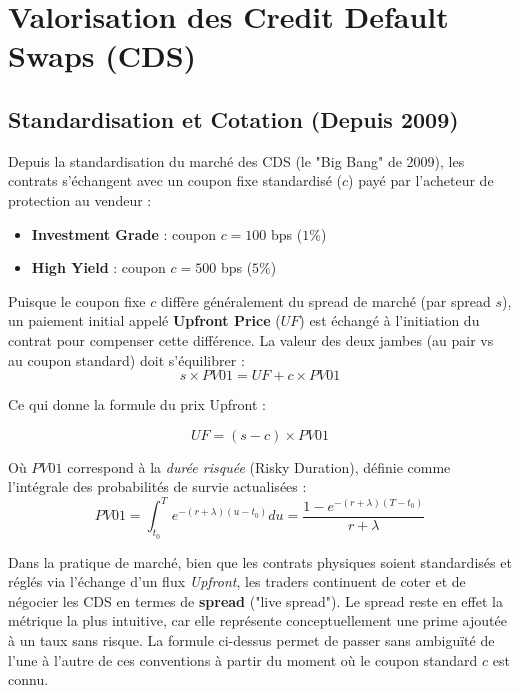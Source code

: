 \chapter{Valorisation des Credit Default Swaps (CDS)}
\label{chap:cds_valuation}

\section{Standardisation et Cotation (Depuis 2009)}

Depuis la standardisation du marché des CDS (le "Big Bang" de 2009), les contrats s'échangent avec un coupon fixe standardisé ($c$) payé par l'acheteur de protection au vendeur :
\begin{itemize}
    \item \textbf{Investment Grade} : coupon $c = 100$ bps ($1\%$)
    \item \textbf{High Yield} : coupon $c = 500$ bps ($5\%$)
\end{itemize}

Puisque le coupon fixe $c$ diffère g\'en\'eralement du spread de marché (par spread $s$), un paiement initial appelé \textbf{Upfront Price} ($UF$) est échangé à l'initiation du contrat pour compenser cette différence. La valeur des deux jambes (au pair vs au coupon standard) doit s'équilibrer :
\begin{equation}
    s \times PV01 = UF + c \times PV01
\end{equation}

Ce qui donne la formule du prix Upfront :
\begin{tcolorbox}[colback=green!5,colframe=green!40!black,title=Upfront Price]
\begin{equation}
    UF = (s - c) \times PV01
\end{equation}
\end{tcolorbox}
Où $PV01$ correspond à la \textit{durée risquée} (Risky Duration), définie comme l'intégrale des probabilités de survie actualisées :
\begin{equation}
    PV01 = \int_{t_0}^T e^{-(r+\lambda)(u-t_0)} du = \frac{1 - e^{-(r+\lambda)(T-t_0)}}{r+\lambda}
\end{equation}

\begin{remarque}
Dans la pratique de marché, bien que les contrats physiques soient standardisés et réglés via l'échange d'un flux \textit{Upfront}, les traders continuent de coter et de négocier les CDS en termes de \textbf{spread} ("live spread"). Le spread reste en effet la métrique la plus intuitive, car elle représente conceptuellement une prime ajoutée à un taux sans risque. La formule ci-dessus permet de passer sans ambiguïté de l'une à l'autre de ces conventions à partir du moment où le coupon standard $c$ est connu.
\end{remarque}

